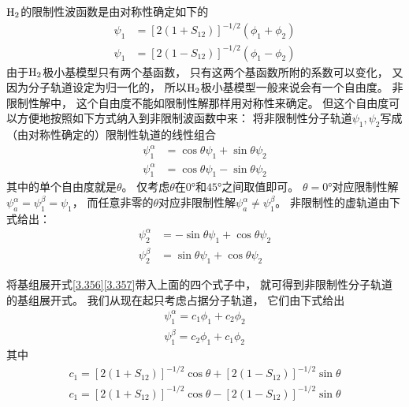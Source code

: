 $\mathrm{H}_2$的限制性波函数是由对称性确定如下的
\begin{align}
	\psi_1 &= [2(1+S_{12} )]^{-1/2}(\phi_1+\phi_2)
	\label{3.356}
	\\
	\psi_1 &= [2(1-S_{12})]^{-1/2}(\phi_1-\phi_2)
	\label{3.357}
\end{align}
由于$\mathrm{H}_2$极小基模型只有两个基函数，
只有这两个基函数所附的系数可以变化，
又因为分子轨道设定为归一化的，
所以$\mathrm{H}_2$极小基模型一般来说会有一个自由度。
非限制性解中，
这个自由度不能如限制性解那样用对称性来确定。
但这个自由度可以方便地按照如下方式纳入到非限制波函数中来：
将非限制性分子轨道$\psi_1,\psi_2$写成（由对称性确定的）限制性轨道的线性组合
\begin{align}
	\psi_1^\alpha &= \cos\theta \psi_1 + \sin\theta \psi_2 \\
	\psi_1^\alpha &= \cos\theta \psi_1 - \sin\theta \psi_2 
\end{align}
其中的单个自由度就是$\theta$。 
仅考虑$\theta$在$0\text{°}$和$45\text{°}$之间取值即可。
$\theta=0\text{°}$对应限制性解$\psi_a^\alpha=\psi_1^\beta=\psi_1$，
而任意非零的$\theta$对应非限制性解$\psi_a^\alpha \neq \psi_1^\beta$。
非限制性的虚轨道由下式给出：
\begin{align}
	\psi_2^\alpha &= - \sin\theta \psi_1 + \cos\theta \psi_2 \label{3.358}\\
	\psi_2^\beta &=  \sin\theta \psi_1 + \cos\theta \psi_2 \label{3.359}
\end{align}

将基组展开式\eqref{3.356}\eqref{3.357}带入上面的四个式子中，
就可得到非限制性分子轨道的基组展开式。
我们从现在起只考虑占据分子轨道，
它们由下式给出
\begin{align}
	\psi_1^\alpha = c_1\phi_1 + c_2\phi_2 \label{3.362}\\
	\psi_1^\beta = c_2\phi_1 + c_1\phi_2 \label{3.363}
\end{align}
其中
\begin{align}
	c_1 = [2(1+S_{12} )]^{-1/2}\cos\theta + [2(1 - S_{12} )]^{-1/2}\sin\theta\\
	c_1 = [2(1+S_{12} )]^{-1/2}\cos\theta - [2(1 - S_{12} )]^{-1/2}\sin\theta
\end{align}

